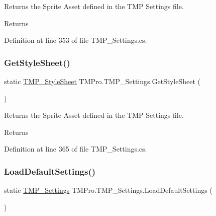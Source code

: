 Returns the Sprite Asset defined in the T\+MP Settings file. 

\begin{DoxyReturn}{Returns}

\end{DoxyReturn}


Definition at line 353 of file T\+M\+P\+\_\+\+Settings.\+cs.

\mbox{\label{class_t_m_pro_1_1_t_m_p___settings_a1aa17efbcaa8a567d58fecb204d02fc5}} 
\subsubsection{\texorpdfstring{GetStyleSheet()}{GetStyleSheet()}}
{\footnotesize\ttfamily static \mbox{\hyperlink{class_t_m_pro_1_1_t_m_p___style_sheet}{T\+M\+P\+\_\+\+Style\+Sheet}} T\+M\+Pro.\+T\+M\+P\+\_\+\+Settings.\+Get\+Style\+Sheet (\begin{DoxyParamCaption}{ }\end{DoxyParamCaption})\hspace{0.3cm}{\ttfamily [static]}}



Returns the Sprite Asset defined in the T\+MP Settings file. 

\begin{DoxyReturn}{Returns}

\end{DoxyReturn}


Definition at line 365 of file T\+M\+P\+\_\+\+Settings.\+cs.

\mbox{\label{class_t_m_pro_1_1_t_m_p___settings_a586aa8771d85a11d12f209991844571e}} 
\subsubsection{\texorpdfstring{LoadDefaultSettings()}{LoadDefaultSettings()}}
{\footnotesize\ttfamily static \mbox{\hyperlink{class_t_m_pro_1_1_t_m_p___settings}{T\+M\+P\+\_\+\+Settings}} T\+M\+Pro.\+T\+M\+P\+\_\+\+Settings.\+Load\+Default\+Settings (\begin{DoxyParamCaption}{ }\end{DoxyParamCaption})\hspace{0.3cm}{\ttfamily [static]}}



